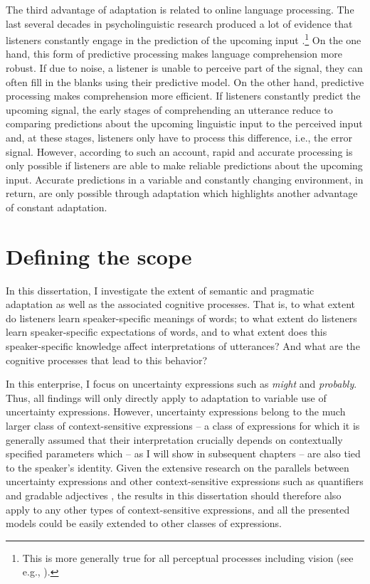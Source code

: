 The third advantage of adaptation is related to online language processing. The last several decades
in psycholinguistic research produced a lot of evidence that listeners constantly engage in the prediction of 
the upcoming input \cite{e.g.KuperbergJaeger2016}.\footnote{This is more generally true for all perceptual 
processes including vision (see e.g., \cite{Clark2013; Friston2010}).} 
On the one hand, this form of predictive processing makes language comprehension more robust. If due to noise,
a listener is unable to perceive part of the signal, they can often fill in the blanks using their predictive model.
On the other hand, predictive processing makes comprehension more efficient. 
If listeners constantly predict the upcoming signal, the early stages of comprehending an utterance 
reduce to comparing predictions about the upcoming linguistic input to the perceived input and, at these stages, 
listeners only have to process this difference, i.e., the error signal. However, according to such an account,
rapid and accurate processing is only possible if listeners are able to make reliable predictions about the upcoming
input. Accurate predictions in a variable and constantly changing environment, in return, are only possible through
 adaptation which highlights another advantage of constant adaptation.

\section{Defining the scope}

In this dissertation, I investigate the extent of semantic and pragmatic adaptation as well as
the associated cognitive processes. That is, to what extent do listeners learn speaker-specific
meanings of words; to what extent do listeners learn speaker-specific expectations of words,
and to what extent does this speaker-specific knowledge affect interpretations of utterances? 
And what are the cognitive processes that lead to this behavior?

In this enterprise, I focus on uncertainty expressions
such as \emph{might} and \emph{probably}. Thus, all findings will only directly apply to 
adaptation to variable use of uncertainty expressions. However, uncertainty expressions 
belong to the much larger class of context-sensitive expressions -- a class of expressions for 
which it is generally assumed  that their interpretation crucially depends on contextually 
specified parameters which -- as I will show in subsequent chapters --
are also tied to the speaker's identity. Given the extensive research on the parallels between
uncertainty expressions and other context-sensitive expressions such as quantifiers and
gradable adjectives \cite{LassiterBook, SchoellerFranke?}, the results in this dissertation
should therefore also apply to any other types of context-sensitive expressions, and all
the presented models could be easily extended to other classes of expressions. 

